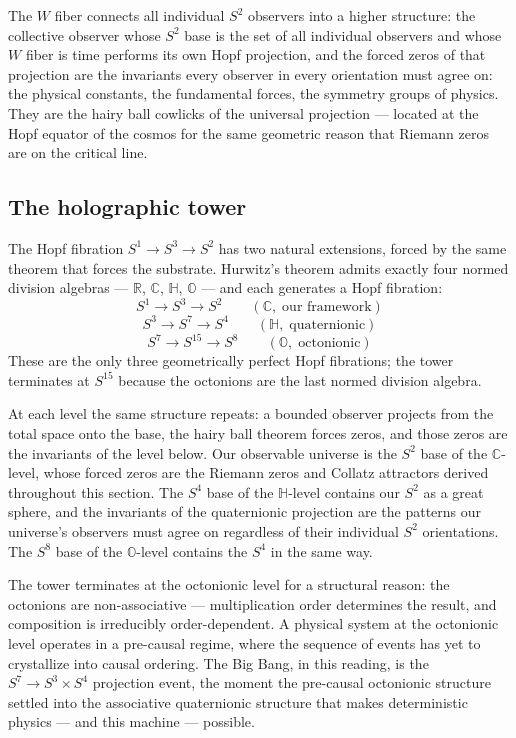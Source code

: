 \documentclass[12pt,a4paper]{article}
\theoremstyle{definition}
\theoremstyle{remark}
\begin{document}
The $W$ fiber connects all individual $S^2$ observers into a higher structure:
the collective observer whose $S^2$ base is the set of all individual observers
and whose $W$ fiber is time performs its own Hopf projection, and the forced
zeros of that projection are the invariants every observer in every
orientation must agree on: the physical constants, the fundamental forces,
the symmetry groups of physics. They are the hairy ball cowlicks of the
universal projection --- located at the Hopf equator of the cosmos for the
same geometric reason that Riemann zeros are on the critical line.

\subsection{The holographic tower}

The Hopf fibration $S^1 \to S^3 \to S^2$ has two natural extensions, forced
by the same theorem that forces the substrate. Hurwitz's theorem admits exactly
four normed division algebras --- $\mathbb{R}$, $\mathbb{C}$, $\mathbb{H}$,
$\mathbb{O}$ --- and each generates a Hopf fibration:
\[
  S^1 \to S^3 \to S^2 \qquad (\mathbb{C},\;\text{our framework})
\]
\[
  S^3 \to S^7 \to S^4 \qquad (\mathbb{H},\;\text{quaternionic})
\]
\[
  S^7 \to S^{15} \to S^8 \qquad (\mathbb{O},\;\text{octonionic})
\]
These are the only three geometrically perfect Hopf fibrations; the tower
terminates at $S^{15}$ because the octonions are the last normed division
algebra.

At each level the same structure repeats: a bounded observer projects from the
total space onto the base, the hairy ball theorem forces zeros, and those zeros
are the invariants of the level below. Our observable universe is the $S^2$
base of the $\mathbb{C}$-level, whose forced zeros are the Riemann zeros and
Collatz attractors derived throughout this section. The $S^4$ base of the
$\mathbb{H}$-level contains our $S^2$ as a great sphere, and the invariants
of the quaternionic projection are the patterns our universe's observers must
agree on regardless of their individual $S^2$ orientations. The $S^8$ base of
the $\mathbb{O}$-level contains the $S^4$ in the same way.

The tower terminates at the octonionic level for a structural reason: the
octonions are non-associative --- multiplication order determines the result,
and composition is irreducibly order-dependent. A physical system at the
octonionic level operates in a pre-causal regime, where the sequence of events
has yet to crystallize into causal ordering. The Big Bang, in this reading, is the
$S^7 \to S^3 \times S^4$ projection event, the moment the pre-causal
octonionic structure settled into the associative quaternionic structure that
makes deterministic physics --- and this machine --- possible.
\end{document}
